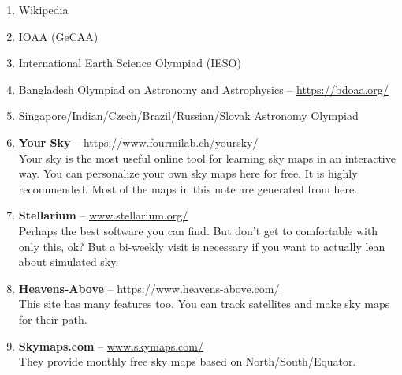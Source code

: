 \documentclass[a4paper,12pt]{extarticle}
\begin{document}
\begin{enumerate}
    \item Wikipedia
    \item  IOAA (GeCAA)
    \item International Earth Science Olympiad (IESO)
    \item Bangladesh Olympiad on Astronomy and Astrophysics -- \url{https://bdoaa.org/}
    \item Singapore/Indian/Czech/Brazil/Russian/Slovak Astronomy Olympiad 
    \item \textbf{Your Sky} -- \url{https://www.fourmilab.ch/yoursky/}\\
Your sky is the most useful online tool for learning sky maps in an interactive way. You can personalize your own sky maps here for free. It is highly recommended. Most of the maps in this note are generated from here.
\item \textbf{Stellarium} -- \url{www.stellarium.org/}\\
Perhaps the best software you can find. But don’t get to comfortable with only this, ok? But a bi-weekly visit is necessary if you want to actually lean about simulated sky.
\item \textbf{Heavens-Above} -- \url{https://www.heavens-above.com/}\\
This site has many features too. You can track satellites and make sky maps for their path.
\item \textbf{Skymaps.com} -- \url{www.skymaps.com/}\\
They provide monthly free sky maps based on North/South/Equator.
\end{enumerate}
\end{document}
